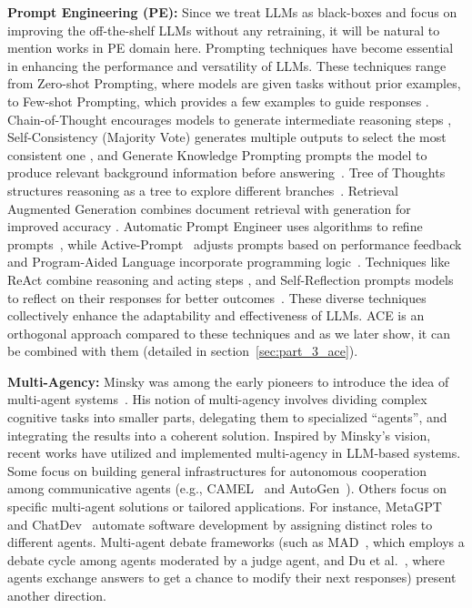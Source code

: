 \textbf{Prompt Engineering (PE):} 
Since we treat LLMs as black-boxes and focus on improving the off-the-shelf LLMs without any retraining, it will be natural to mention works in PE domain here. Prompting techniques have become essential in enhancing the performance and versatility of LLMs. These techniques range from Zero-shot Prompting, where models are given tasks without prior examples, to Few-shot Prompting, which provides a few examples to guide responses \cite{brown2020fewshot}. Chain-of-Thought encourages models to generate intermediate reasoning steps \cite{wei2022cot},
Self-Consistency (Majority Vote) generates multiple outputs to select the most consistent one \cite{wang2022majority,lewkowycz2022majority2}, and Generate Knowledge Prompting prompts the model to produce relevant background information before answering~\cite{liu2021generated}. Tree of Thoughts structures reasoning as a tree to explore different branches~\cite{yao2024tree,long2023tree2}. Retrieval Augmented Generation combines document retrieval with generation for improved accuracy \cite{lewis2020retrieval}. Automatic Prompt Engineer uses algorithms to refine prompts~\cite{zhou2022prompteng}, while Active-Prompt~\cite{diao2023active} adjusts prompts based on performance feedback and Program-Aided Language  incorporate programming logic~\cite{gao2023pal}. Techniques like ReAct combine reasoning and acting steps \cite{yao2022react}, and Self-Reflection prompts models to reflect on their responses for better outcomes~\cite{madaan2024selfreflection, shinn2024reflexion}.  These diverse techniques collectively enhance the adaptability and effectiveness of LLMs. ACE is an orthogonal approach compared to these techniques and as we later show, it can be combined with them (detailed in section~\ref{sec:part_3_ace}).

\textbf{Multi-Agency:} 
Minsky was among the early pioneers to introduce the idea of multi-agent systems~\cite{minsky1988society}. His notion of multi-agency involves dividing complex cognitive tasks into smaller parts, delegating them to specialized “agents”, and integrating the results into a coherent solution. Inspired by Minsky’s vision, recent works have utilized and implemented multi-agency in LLM-based systems.
Some focus on building general infrastructures for autonomous cooperation among communicative agents (e.g., CAMEL~\cite{li2023camel} and AutoGen~\cite{wu2023autogen}). Others focus on specific multi-agent solutions or tailored applications. For instance, MetaGPT~\cite{hong2023metagpt} and ChatDev~\cite{qian2023chatdev} automate software development by assigning distinct roles to different agents. Multi-agent debate frameworks (such as MAD~\cite{liang2023mad}, which employs a debate cycle among agents moderated by a judge agent, and Du et al.~\cite{du2023debate}, where agents exchange answers to get a chance to modify their next responses) present another direction. 

